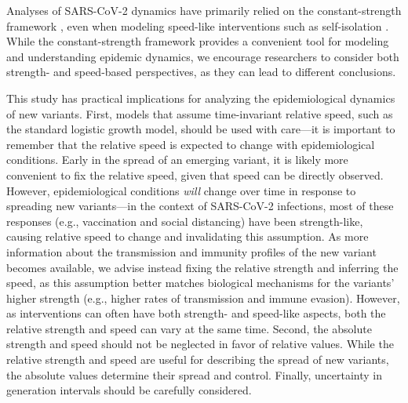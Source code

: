 \documentclass[12pt]{article}
\begin{document}
Analyses of SARS-CoV-2 dynamics have primarily relied on the constant-strength framework \citep{gostic2020practical,unwin2020state,brauner2021inferring}, even when modeling speed-like interventions such as self-isolation \citep{flaxman2020Rt,brett2020transmission}.
While the constant-strength framework provides a convenient tool for modeling and understanding epidemic dynamics, we encourage researchers to consider both strength- and speed-based perspectives, as they can lead to different conclusions.

This study has practical implications for analyzing the epidemiological dynamics of new variants.
First, models that assume time-invariant relative speed, such as the standard logistic growth model, should be used with care---it is important to remember that the relative speed is expected to change with epidemiological conditions.
Early in the spread of an emerging variant, it is likely more convenient to fix the relative speed, given that speed can be directly observed.
However, epidemiological conditions \textit{will} change over time in response to spreading new variants---in the context of SARS-CoV-2 infections, most of these responses (e.g., vaccination and social distancing) have been strength-like, causing relative speed to change and invalidating this assumption.
As more information about the transmission and immunity profiles of the new variant becomes available, we advise instead fixing the relative strength and inferring the speed, as this assumption better matches biological mechanisms for the variants' higher strength (e.g., higher rates of transmission and immune evasion).
However, as interventions can often have both strength- and speed-like aspects, both the relative strength and speed can vary at the same time.
Second, the absolute strength and speed should not be neglected in favor of relative values.
While the relative strength and speed are useful for describing the spread of new variants, the absolute values determine their spread and control.
Finally, uncertainty in generation intervals should be carefully considered.
\end{document}

